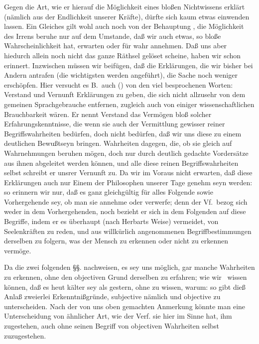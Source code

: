 Gegen die Art, wie er hierauf  die Möglichkeit eines bloßen Nichtwissens erklärt (nämlich aus der Endlichkeit unserer Kräfte), dürfte sich kaum etwas einwenden lassen. Ein Gleiches gilt wohl auch noch von der Behauptung , die Möglichkeit des Irrens beruhe nur auf dem Umstande, daß wir auch etwas, so bloße Wahrscheinlichkeit hat, erwarten oder für wahr annehmen. Daß uns aber hiedurch allein noch nicht das ganze Räthsel gelöset scheine, haben wir schon erinnert. Inzwischen müssen wir beifügen, daß die Erklärungen, die wir bisher bei Andern antrafen (die wichtigsten werden  angeführt), die Sache noch weniger erschöpfen. Hier versucht es B.\ auch () von den viel besprochenen Worten: Verstand und Vernunft Erklärungen zu geben, die sich nicht allzusehr von dem gemeinen Sprachgebrauche entfernen, zugleich auch von einiger wissenschaftlichen Brauchbarkeit wären. Er nennt Verstand das Vermögen bloß solcher Erfahrungskenntnisse, die wenn sie auch der Vermittlung gewisser reiner Begriffswahrheiten bedürfen, doch nicht bedürfen, daß wir uns diese zu einem deutlichen Bewußtseyn bringen. Wahrheiten dagegen, die, ob sie gleich auf Wahrnehmungen beruhen mögen, doch nur durch deutlich gedachte Vordersätze aus ihnen abgeleitet werden können, und alle diese reinen Begriffswahrheiten selbst schreibt er unsrer Vernunft zu. Da wir im Voraus nicht erwarten,  daß diese Erklärungen auch nur Einem der Philosophen unserer Tage genehm seyn werden: so erinnern wir nur, daß es ganz gleichgültig für alles Folgende sowie Vorhergehende sey, ob man sie annehme oder verwerfe; denn der Vf.\ bezog sich weder in dem Vorhergehenden, noch bezieht er sich in dem Folgenden auf diese Begriffe, indem er es überhaupt (nach Herbarts Weise) vermeidet, von Seelenkräften zu reden, und aus willkürlich angenommenen Begriffbestimmungen derselben zu folgern, was der Mensch zu erkennen oder nicht zu erkennen vermöge. \par 
Da die zwei folgenden §§. nachweisen, es sey uns möglich, gar manche Wahrheiten zu erkennen, ohne den objectiven Grund derselben zu erfahren; wie wir \zB\ wissen können, daß es heut kälter sey als gestern, ohne zu wissen, warum: so gibt dieß Anlaß zweierlei Erkenntnißgründe, subjective nämlich und objective zu unterscheiden. Nach der von uns oben gemachten Anmerkung könnte man eine Unterscheidung von ähnlicher Art, wie der Verf. sie hier im Sinne hat, ihm zugestehen, auch ohne seinen Begriff von objectiven Wahrheiten selbst zuzugestehen. \par 
